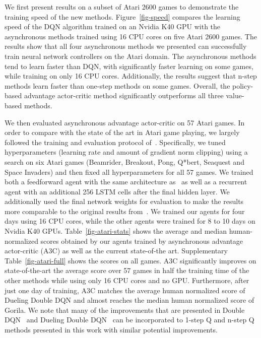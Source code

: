We first present results on a subset of Atari 2600 games to demonstrate the training speed of the new methods.
Figure~\ref{fig-speed} compares the learning speed of the DQN algorithm trained on an Nvidia K40 GPU with the asynchronous methods trained using 16 CPU cores on five Atari 2600 games.
The results show that all four asynchronous methods we presented can successfully train neural network controllers on the Atari domain.
The asynchronous methods tend to learn faster than DQN, with significantly faster learning on some games, while training on only 16 CPU cores.
Additionally, the results suggest that n-step methods learn faster than one-step methods on some games.
Overall, the policy-based advantage actor-critic method significantly outperforms all three value-based methods.

We then evaluated asynchronous advantage actor-critic on 57 Atari games.
In order to compare with the state of the art in Atari game playing, we largely followed the training
and evaluation protocol of~\cite{hado2015doubledqn}.
Specifically, we tuned hyperparameters (learning rate and amount of gradient norm clipping) using a search on six Atari games (Beamrider, Breakout, Pong, Q*bert, Seaquest and Space Invaders) and then fixed all hyperparameters for all 57 games.
We trained both a feedforward agent with the same architecture as~\citep{mnih-dqn-2015,nair2015gorila,hado2015doubledqn} as well as a recurrent agent with an additional 256 LSTM cells after the final hidden layer.
We additionally used the final network weights for evaluation to make the results more comparable to the original results from~\cite{bellemare-ale}.
We trained our agents for four days using 16 CPU cores, while the other agents were trained for 8 to 10 days on Nvidia K40 GPUs.
Table~\ref{fig-atari-stats} shows the average and median human-normalized scores obtained by our agents trained by asynchronous advantage actor-critic (A3C) as well as
the current state-of-the art. Supplementary Table~\ref{fig-atari-full} shows the scores on all games.
A3C significantly improves on state-of-the-art the average score over 57 games
in half the training time of the other methods while using only 16 CPU cores and no GPU.
Furthermore, after just one day of training, A3C matches the average human normalized score of Dueling Double DQN and almost reaches the median human normalized score of Gorila. We note that many of the improvements that are presented in Double DQN~\citep{hado2015doubledqn} and Dueling Double DQN~\citep{wang2015dueling} can be incorporated to 1-step Q and n-step Q methods presented in this work with similar potential improvements.

